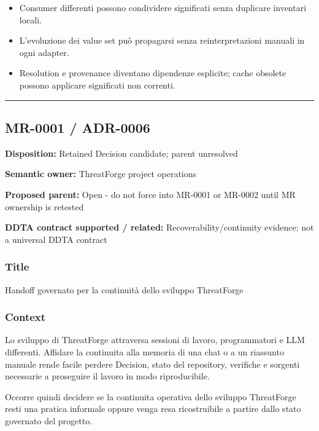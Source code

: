 \documentclass[
  10pt,
  a4paper,
]{article}
\providecommand{\tightlist}{%
  \setlength{\itemsep}{0pt}\setlength{\parskip}{0pt}}
\begin{document}
\begin{itemize}
\tightlist
\item
  Consumer differenti possono condividere significati senza duplicare
  inventari locali.
\item
  L'evoluzione dei value set può propagarsi senza reinterpretazioni
  manuali in ogni adapter.
\item
  Resolution e provenance diventano dipendenze esplicite; cache obsolete
  possono applicare significati non correnti.
\end{itemize}

\begin{center}\rule{0.5\linewidth}{0.5pt}\end{center}

\subsection{MR-0001 / ADR-0006}\label{mr-0001-adr-0006}

\textbf{Disposition:} Retained Decision candidate; parent unresolved

\textbf{Semantic owner:} ThreatForge project operations

\textbf{Proposed parent:} Open - do not force into MR-0001 or MR-0002
until MR ownership is retested

\textbf{DDTA contract supported / related:} Recoverability/continuity
evidence; not a universal DDTA contract

\subsubsection{Title}\label{title-4}

Handoff governato per la continuità dello sviluppo ThreatForge

\subsubsection{Context}\label{context-4}

Lo sviluppo di ThreatForge attraversa sessioni di lavoro, programmatori
e LLM differenti. Affidare la continuita alla memoria di una chat o a un
riassunto manuale rende facile perdere Decision, stato del repository,
verifiche e sorgenti necessarie a proseguire il lavoro in modo
riproducibile.

Occorre quindi decidere se la continuita operativa dello sviluppo
ThreatForge resti una pratica informale oppure venga resa ricostruibile
a partire dallo stato governato del progetto.
\end{document}
